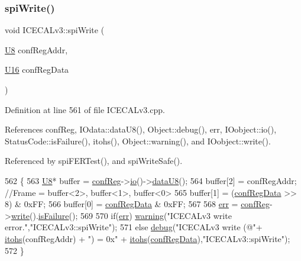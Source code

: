 \subsubsection{\texorpdfstring{spi\+Write()}{spiWrite()}}
{\footnotesize\ttfamily void I\+C\+E\+C\+A\+Lv3\+::spi\+Write (\begin{DoxyParamCaption}\item[{\hyperlink{ICECALv3_8h_a3cb25ca6f51f003950f9625ff05536fc}{U8}}]{conf\+Reg\+Addr,  }\item[{\hyperlink{ICECALv3_8h_adf928e51a60dba0df29d615401cc55a8}{U16}}]{conf\+Reg\+Data }\end{DoxyParamCaption})\hspace{0.3cm}{\ttfamily [private]}}



Definition at line 561 of file I\+C\+E\+C\+A\+Lv3.\+cpp.



References conf\+Reg, I\+Odata\+::data\+U8(), Object\+::debug(), err, I\+Oobject\+::io(), Status\+Code\+::is\+Failure(), itohs(), Object\+::warning(), and I\+Oobject\+::write().



Referenced by spi\+F\+E\+R\+Test(), and spi\+Write\+Safe().


\begin{DoxyCode}
562 \{
563     \hyperlink{ICECALv3_8h_a3cb25ca6f51f003950f9625ff05536fc}{U8}* buffer = \hyperlink{classICECALv3_a6e8b6c03f5b0f1d8281bf8a0fa46064f}{confReg}->\hyperlink{classIOobject_af04fb94137c3d86849f478ac5afab5d1}{io}()->\hyperlink{classIOdata_a75e9c318dbac3a39402179070943d4bc}{dataU8}();
564     buffer[2] = confRegAddr;                                \textcolor{comment}{//Frame = buffer<2>, buffer<1>, buffer<0>}
565     buffer[1] = (\hyperlink{structconfRegData}{confRegData} >> 8) & 0xFF;
566     buffer[0] =  \hyperlink{structconfRegData}{confRegData}       & 0xFF;
567 
568     \hyperlink{classICECALv3_ad8989925ee5b3ff322d863ce6aaff0bd}{err} = \hyperlink{classICECALv3_a6e8b6c03f5b0f1d8281bf8a0fa46064f}{confReg}->\hyperlink{classIOobject_a9f6984bc9f0fadcf800f1be2523ac744}{write}().\hyperlink{classStatusCode_a5dd22dc6eb2c52fc4cabc58f6dea2eb7}{isFailure}();
569 
570     \textcolor{keywordflow}{if}(\hyperlink{classICECALv3_ad8989925ee5b3ff322d863ce6aaff0bd}{err})  \hyperlink{classObject_a65cd4fda577711660821fd2cd5a3b4c9}{warning}(\textcolor{stringliteral}{"ICECALv3 write error."},\textcolor{stringliteral}{"ICECALv3::spiWrite"});
571     \textcolor{keywordflow}{else}      \hyperlink{classObject_aac010553f022165573714b7014a15f0d}{debug}(\textcolor{stringliteral}{"ICECALv3 write (@"}+ \hyperlink{classICECALv3_a04b02e583f191bfce34d05132cd23834}{itohs}(confRegAddr) + \textcolor{stringliteral}{") = 0x"} + 
      \hyperlink{classICECALv3_a04b02e583f191bfce34d05132cd23834}{itohs}(\hyperlink{structconfRegData}{confRegData}),\textcolor{stringliteral}{"ICECALv3::spiWrite"});
572 \}
\end{DoxyCode}
\mbox{\label{classICECALv3_aa0b8358ea0be8e47a8aded5e1551787f}} 
